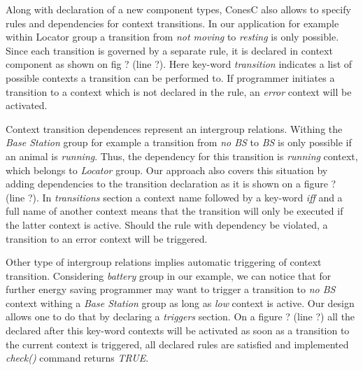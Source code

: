 Along with declaration of a new component types, ConesC also allows to specify rules and dependencies for context transitions. In our application for example within Locator group a transition from \emph{not moving} to \emph{resting} is only possible. Since each transition is governed by a separate rule, it is declared in context component as shown on fig ? (line ?). Here key-word \emph{transition} indicates a list of possible contexts a transition can be performed to. If programmer initiates a transition to a context which is not declared in the rule, an \emph{error} context will be activated.

Context transition dependences represent an intergroup relations. Withing the \emph{Base Station} group for example a transition from \emph{no BS} to \emph{BS} is only possible if an animal is \emph{running}. Thus, the dependency for this transition is \emph{running} context, which belongs to \emph{Locator} group. Our approach also covers this situation by adding dependencies to the transition declaration as it is shown on a figure ? (line ?). In \emph{transitions} section a context name followed by a key-word \emph{iff} and a full name of another context means that the transition will only be executed if the latter context is active. Should the rule with dependency be violated, a transition to an error context will be triggered.

Other type of intergroup relations implies automatic triggering of context transition. Considering \emph{battery} group in our example, we can notice that for further energy saving programmer may want to trigger a transition to \emph{no BS} context withing a \emph{Base Station} group as long as \emph{low} context is active. Our design allows one to do that by declaring a \emph{triggers} section. On a figure ? (line ?) all the declared after this key-word contexts will be activated as soon as a transition to the current context is triggered, all declared rules are satisfied and implemented \emph{check()} command returns \emph{TRUE}.